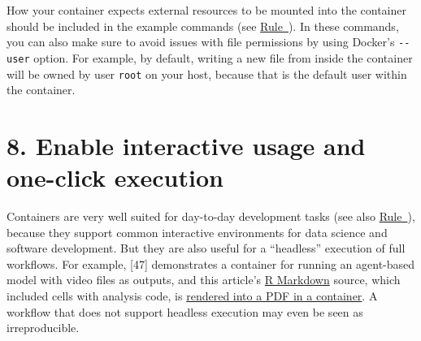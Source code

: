 \documentclass[10pt,letterpaper]{article}
\newenvironment{Shaded}{\begin{snugshade}}{\end{snugshade}}
\newcommand{\BuiltInTok}[1]{#1}
\newcommand{\CommentTok}[1]{\textcolor[rgb]{0.56,0.35,0.01}{\textit{#1}}}
\newcommand{\ExtensionTok}[1]{#1}
\newcommand{\NormalTok}[1]{#1}
\newcommand{\VariableTok}[1]{\textcolor[rgb]{0.00,0.00,0.00}{#1}}
\begin{document}
\begin{Shaded}
\end{Shaded}

\normalsize

How your container expects external resources to be mounted into the
container should be included in the example commands (see
\hyperref[{rule:formatting}]{Rule~}). In
these commands, you can also make sure to avoid issues with file
permissions by using Docker's \texttt{-\/-user} option. For example, by
default, writing a new file from inside the container will be owned by
user \texttt{root} on your host, because that is the default user within
the container.

\hypertarget{enable-interactive-usage-and-one-click-execution}{%
\section*{8. Enable interactive usage and one-click
execution}\label{enable-interactive-usage-and-one-click-execution}}

  \label{rule:interactive} 

Containers are very well suited for day-to-day development tasks (see
also \hyperref[{rule:usage}]{Rule~}), because they
support common interactive environments for data science and software
development. But they are also useful for a ``headless'' execution of
full workflows. For example, {[}47{]} demonstrates a container for
running an agent-based model with video files as outputs, and this
article's \href{https://rmarkdown.rstudio.com/}{R Markdown} source,
which included cells with analysis code, is
\href{https://github.com/nuest/ten-simple-rules-dockerfiles/blob/master/.travis.yml\#L18}{rendered
into a PDF in a container}. A workflow that does not support headless
execution may even be seen as irreproducible.
\end{document}
